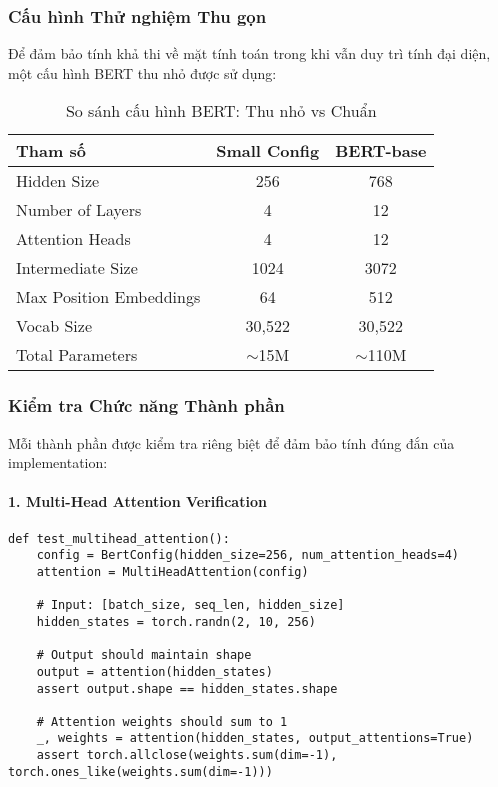 \subsubsection{Cấu hình Thử nghiệm Thu gọn}
Để đảm bảo tính khả thi về mặt tính toán trong khi vẫn duy trì tính đại diện, một cấu hình BERT thu nhỏ được sử dụng:

\begin{table}[H]
\centering
\caption{So sánh cấu hình BERT: Thu nhỏ vs Chuẩn}
\label{tab:bert_config_comparison}
\begin{tabular}{lcc}
\toprule
\textbf{Tham số} & \textbf{Small Config} & \textbf{BERT-base} \\
\midrule
Hidden Size & 256 & 768 \\
Number of Layers & 4 & 12 \\
Attention Heads & 4 & 12 \\
Intermediate Size & 1024 & 3072 \\
Max Position Embeddings & 64 & 512 \\
Vocab Size & 30,522 & 30,522 \\
Total Parameters & $\sim$15M & $\sim$110M \\
\bottomrule
\end{tabular}
\end{table}

\subsubsection{Kiểm tra Chức năng Thành phần}

Mỗi thành phần được kiểm tra riêng biệt để đảm bảo tính đúng đắn của implementation:

\paragraph{1. Multi-Head Attention Verification}
\begin{verbatim}
def test_multihead_attention():
    config = BertConfig(hidden_size=256, num_attention_heads=4)
    attention = MultiHeadAttention(config)
    
    # Input: [batch_size, seq_len, hidden_size]
    hidden_states = torch.randn(2, 10, 256)
    
    # Output should maintain shape
    output = attention(hidden_states)
    assert output.shape == hidden_states.shape
    
    # Attention weights should sum to 1
    _, weights = attention(hidden_states, output_attentions=True)
    assert torch.allclose(weights.sum(dim=-1), torch.ones_like(weights.sum(dim=-1)))
\end{verbatim}

